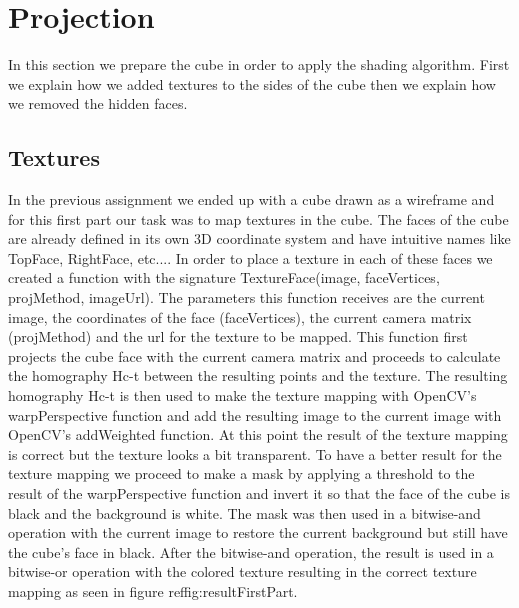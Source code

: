 \section{Projection}
	In this section we prepare the cube in order to apply the shading algorithm. First we explain how we added textures to the sides of the cube then we explain how we removed the hidden faces.
\subsection{Textures}
In the previous assignment we ended up with a cube drawn as a wireframe and for this first part our task was to map textures in the cube. The faces of the cube are already defined in its own 3D coordinate system and have intuitive names like TopFace, RightFace, etc.... In order to place a texture in each of these faces we created a function with the signature TextureFace(image, faceVertices, projMethod, imageUrl). The parameters this function receives are the current image, the coordinates of the face (faceVertices), the current camera matrix (projMethod) and the url for the texture to be mapped. This function first projects the cube face with the current camera matrix and proceeds to calculate the homography Hc-t between the resulting points and the texture. The resulting homography Hc-t is then used to make the texture mapping with OpenCV's warpPerspective function and add the resulting image to the current image with OpenCV's addWeighted function. At this point the result of the texture mapping is correct but the texture looks a bit transparent. To have a better result for the texture mapping we proceed to make a mask by applying a threshold to the result of the warpPerspective function and invert it so that the face of the cube is black and the background is white. The mask was then used in a bitwise-and operation with the current image to restore the current background but still have the cube's face in black. After the bitwise-and operation, the result is used in a bitwise-or operation with the colored texture resulting in the correct texture mapping as seen in figure ref{fig:resultFirstPart}.
